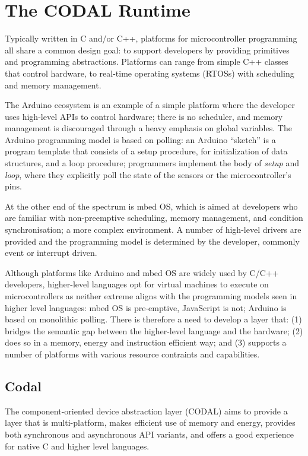 \section{The CODAL Runtime}
\label{sec:codal}

Typically written in C and/or C++, platforms for microcontroller programming all share a common design goal: to support developers by providing primitives and programming abstractions. Platforms can range from simple C++ classes that control hardware, to real-time operating systems (RTOSs) with scheduling and memory management.

The Arduino ecosystem is an example of a simple platform where the developer uses high-level APIs to control hardware; there is no scheduler, and memory management is discouraged through a heavy emphasis on global variables.  The Arduino programming model is based on polling: an Arduino ``sketch'' is a program template that consists of a setup procedure, for initialization of data structures, and a loop procedure; programmers implement the body of \textit{setup} and \textit{loop}, where they explicitly poll the state of the sensors or the microcontroller's pins.

At the other end of the spectrum is mbed OS, which is aimed at developers who are familiar with non-preemptive scheduling, memory management, and condition synchronisation; a more complex environment. A number of high-level drivers are provided and the programming model is determined by the developer, commonly event or interrupt driven.

Although platforms like Arduino and mbed OS are widely used by C/C++ developers, higher-level languages opt for virtual machines to execute on microcontrollers as neither extreme aligns with the programming models seen in higher level languages: mbed OS is pre-emptive, JavaScript is not; Arduino is based on monolithic polling. There is therefore a need to develop a layer that: (1) bridges the semantic gap between the higher-level language and the hardware; (2) does so in a memory, energy and instruction efficient way; and (3) supports a number of platforms with various resource contraints and capabilities.

\subsection{Codal}

The component-oriented device abstraction layer (CODAL) aims to provide a layer that is multi-platform, makes efficient use of memory and energy, provides both synchronous and asynchronous API variants, and offers a good experience for native C and higher level languages.

